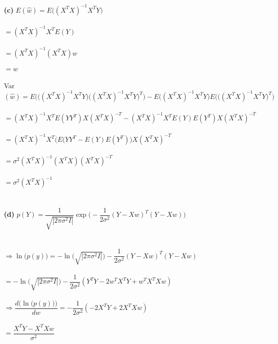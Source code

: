 \documentclass[submit]{harvardml}
\begin{document}
\textbf{(c)} $E(\hat w)=E\big((X^TX)^{-1}X^TY\big)$\\\\
$=(X^TX)^{-1}X^TE(Y)$\\\\
$=(X^TX)^{-1}(X^TX)w$\\\\
$=w$\\\\
Var$(\hat w)=E\Big(\big((X^TX)^{-1}X^TY\big)\big((X^TX)^{-1}X^TY\big)^T\Big)-E\Big((X^TX)^{-1}X^TY\Big)E\Big(\big((X^TX)^{-1}X^TY\big)^T\Big)$\\\\
$=(X^TX)^{-1}X^TE(YY^T)X(X^TX)^{-T}-(X^TX)^{-1}X^TE(Y)E(Y^T)X(X^TX)^{-T}$\\\\
$=(X^TX)^{-1}X^T\big(E(YY^T-E(Y)E(Y^T)\big)X(X^TX)^{-T}$\\\\
$=\sigma^2(X^TX)^{-1}(X^TX)(X^TX)^{-T}$\\\\
$=\sigma^2(X^TX)^{-1}$\\\\\\

\textbf{(d)} $p(Y)=\dfrac{1}{\sqrt{|2\pi\sigma^2I|}}\exp\Bigg(-\dfrac{1}{2\sigma^2}(Y-Xw)^T(Y-Xw)\Bigg)$\\\\\\
$\Rightarrow \ln\big(p(y)\big)=-\ln\big(\sqrt{|2\pi\sigma^2I|}\big)-\dfrac{1}{2\sigma^2}(Y-Xw)^T(Y-Xw)$\\\\
$=-\ln\big(\sqrt{|2\pi\sigma^2I|}\big)-\dfrac{1}{2\sigma^2}(Y^TY-2w^TX^TY+w^TX^TXw)$\\\\
$\Rightarrow \dfrac{d\Big(\ln\big(p(y)\big)\Big)}{dw}=-\dfrac{1}{2\sigma^2}(-2X^TY+2X^TXw)$\\\\
$=\dfrac{X^TY-X^TXw}{\sigma^2}$\\\\\\
\end{document}
